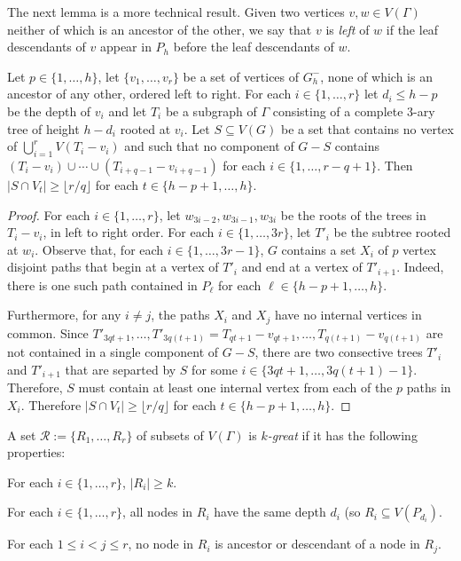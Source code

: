 \documentclass{patmorin}
\newcommand{\defin}[1]{\emph{\color{brightmaroon}#1}}
\begin{document}
The next lemma is a more technical result.  Given two vertices $v,w\in V(\Gamma)$ neither of which is an ancestor of the other, we say that $v$ is \defin{left} of $w$ if the leaf descendants of $v$ appear in $P_h$ before the leaf descendants of $w$.

\begin{lem}\label{subtree_splitting}
  Let $p\in\{1,\ldots,h\}$, let $\{v_1,\ldots,v_r\}$ be a set of vertices of $G_h^-$, none of which is an ancestor of any other, ordered left to right.  For each $i\in\{1,\ldots,r\}$ let $d_i\le h-p$ be the depth of $v_i$ and let $T_i$ be a subgraph of $\Gamma$ consisting of a complete $3$-ary tree of height $h-d_i$ rooted at $v_i$.  Let $S\subseteq V(G)$ be a set that contains no vertex of $\bigcup_{i=1}^r V(T_i-v_i)$ and such that no component of $G-S$ contains $(T_i-v_i)\cup\cdots\cup (T_{i+q-1}-v_{i+q-1})$ for each $i\in\{1,\ldots,r-q+1\}$.  Then $|S\cap V_t|\ge \lfloor r/q\rfloor$ for each $t\in\{h-p+1,\ldots,h\}$.
\end{lem}

\begin{proof}
  For each $i\in\{1,\ldots,r\}$, let $w_{3i-2},w_{3i-1},w_{3i}$ be the roots of the trees in $T_i-v_i$, in left to right order.  For each $i\in\{1,\ldots,3r\}$, let $T'_i$ be the subtree rooted at $w_i$.  Observe that, for each $i\in\{1,\ldots,3r-1\}$, $G$ contains a set $X_{i}$ of $p$ vertex disjoint paths that begin at a vertex of $T'_{i}$ and end at a vertex of $T'_{i+1}$.  Indeed, there is one such path contained in $P_\ell$ for each $\ell\in\{h-p+1,\ldots,h\}$.

  Furthermore, for any $i\neq j$, the paths $X_i$ and $X_j$ have no internal vertices in common.  Since $T'_{3qt+1},\ldots,T'_{3q(t+1)}=T_{qt+1}-v_{qt+1},\ldots,T_{q(t+1)}-v_{q(t+1)}$ are not contained in a single component of $G-S$, there are two consective trees $T'_i$ and $T'_{i+1}$ that are separted by $S$ for some $i\in\{3qt+1,\ldots,3q(t+1)-1\}$.  Therefore, $S$ must contain at least one internal vertex from each of the $p$ paths in $X_{i}$.  Therefore $|S\cap V_t|\ge \lfloor r/q\rfloor$ for each $t\in\{h-p+1,\ldots,h\}$.
\end{proof}

A set $\mathcal{R}:=\{R_1,\ldots,R_r\}$ of subsets of $V(\Gamma)$ is \defin{$k$-great} if it has the following properties:

\begin{compactenum}
  \item For each $i\in\{1,\ldots,r\}$, $|R_i|\ge k$.
  \item For each $i\in\{1,\ldots,r\}$, all nodes in $R_i$ have the same depth $d_i$ (so $R_i\subseteq V(P_{d_i})$.
  \item For each $1\le i<j\le r$, no node in $R_i$ is ancestor or descendant of a node in $R_j$.
\end{compactenum}
\end{document}
